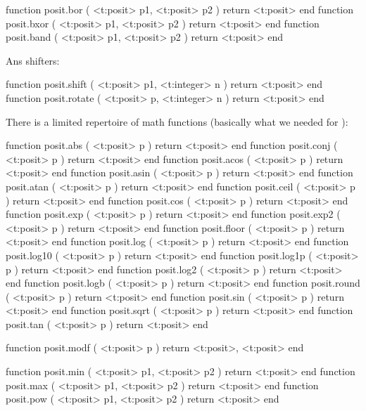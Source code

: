 \starttyping[option=LUA]
function posit.bor  ( <t:posit> p1, <t:posit> p2 ) return <t:posit> end
function posit.bxor ( <t:posit> p1, <t:posit> p2 ) return <t:posit> end
function posit.band ( <t:posit> p1, <t:posit> p2 ) return <t:posit> end
\stoptyping

Ans shifters:

\starttyping[option=LUA]
function posit.shift  ( <t:posit> p1, <t:integer> n ) return <t:posit> end
function posit.rotate ( <t:posit> p,  <t:integer> n ) return <t:posit> end
\stoptyping

There is a limited repertoire of math functions (basically what we needed for
\METAPOST):

\starttyping[option=LUA]
function posit.abs   ( <t:posit> p ) return <t:posit> end
function posit.conj  ( <t:posit> p ) return <t:posit> end
function posit.acos  ( <t:posit> p ) return <t:posit> end
function posit.asin  ( <t:posit> p ) return <t:posit> end
function posit.atan  ( <t:posit> p ) return <t:posit> end
function posit.ceil  ( <t:posit> p ) return <t:posit> end
function posit.cos   ( <t:posit> p ) return <t:posit> end
function posit.exp   ( <t:posit> p ) return <t:posit> end
function posit.exp2  ( <t:posit> p ) return <t:posit> end
function posit.floor ( <t:posit> p ) return <t:posit> end
function posit.log   ( <t:posit> p ) return <t:posit> end
function posit.log10 ( <t:posit> p ) return <t:posit> end
function posit.log1p ( <t:posit> p ) return <t:posit> end
function posit.log2  ( <t:posit> p ) return <t:posit> end
function posit.logb  ( <t:posit> p ) return <t:posit> end
function posit.round ( <t:posit> p ) return <t:posit> end
function posit.sin   ( <t:posit> p ) return <t:posit> end
function posit.sqrt  ( <t:posit> p ) return <t:posit> end
function posit.tan   ( <t:posit> p ) return <t:posit> end

function posit.modf ( <t:posit> p )
    return
        <t:posit>,
        <t:posit>
end

function posit.min ( <t:posit> p1, <t:posit> p2 ) return <t:posit> end
function posit.max ( <t:posit> p1, <t:posit> p2 ) return <t:posit> end
function posit.pow ( <t:posit> p1, <t:posit> p2 ) return <t:posit> end
\stoptyping


